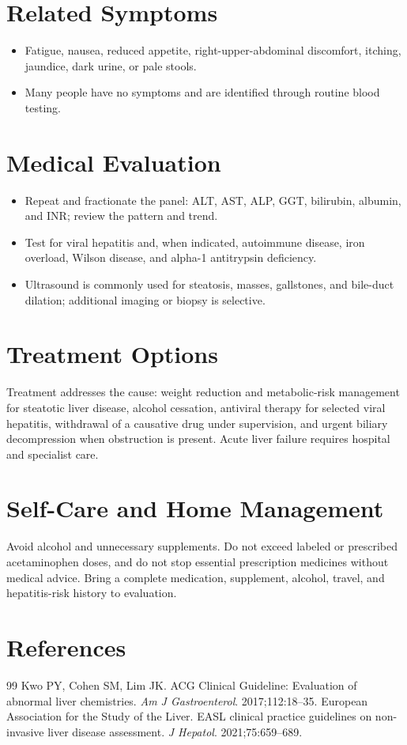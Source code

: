 \section*{Related Symptoms}
\begin{itemize}
  \item Fatigue, nausea, reduced appetite, right-upper-abdominal discomfort, itching, jaundice, dark urine, or pale stools.
  \item Many people have no symptoms and are identified through routine blood testing.
\end{itemize}

\section*{Medical Evaluation}
\begin{itemize}
  \item Repeat and fractionate the panel: ALT, AST, ALP, GGT, bilirubin, albumin, and INR; review the pattern and trend.
  \item Test for viral hepatitis and, when indicated, autoimmune disease, iron overload, Wilson disease, and alpha-1 antitrypsin deficiency.
  \item Ultrasound is commonly used for steatosis, masses, gallstones, and bile-duct dilation; additional imaging or biopsy is selective.
\end{itemize}

\section*{Treatment Options}
Treatment addresses the cause: weight reduction and metabolic-risk management for steatotic liver disease, alcohol cessation, antiviral therapy for selected viral hepatitis, withdrawal of a causative drug under supervision, and urgent biliary decompression when obstruction is present. Acute liver failure requires hospital and specialist care.

\section*{Self-Care and Home Management}
Avoid alcohol and unnecessary supplements. Do not exceed labeled or prescribed acetaminophen doses, and do not stop essential prescription medicines without medical advice. Bring a complete medication, supplement, alcohol, travel, and hepatitis-risk history to evaluation.

\section*{References}
\begin{thebibliography}{99}
 Kwo PY, Cohen SM, Lim JK. ACG Clinical Guideline: Evaluation of abnormal liver chemistries. \textit{Am J Gastroenterol}. 2017;112:18--35.
 European Association for the Study of the Liver. EASL clinical practice guidelines on non-invasive liver disease assessment. \textit{J Hepatol}. 2021;75:659--689.
\end{thebibliography}
